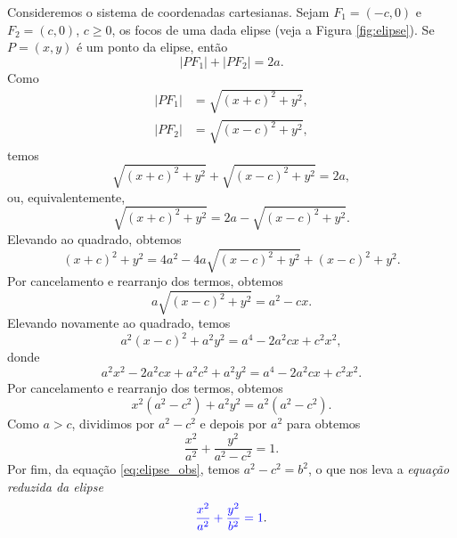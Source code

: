 Consideremos o sistema de coordenadas cartesianas. Sejam $F_1=(-c,0)$ e $F_2=(c,0)$, $c\geq 0$, os focos de uma dada elipse (veja a Figura \ref{fig:elipse}).  Se $P=(x,y)$ é um ponto da elipse, então
\begin{equation}
  |PF_1| + |PF_2| = 2a.
\end{equation}
Como
\begin{align}
  |PF_1| &= \sqrt{(x+c)^2 + y^2}, \\
  |PF_2| &= \sqrt{(x-c)^2 + y^2},
\end{align}
temos
\begin{equation}
  \sqrt{(x+c)^2 + y^2} + \sqrt{(x-c)^2 + y^2} = 2a,
\end{equation}
ou, equivalentemente,
\begin{equation}
  \sqrt{(x+c)^2 + y^2} = 2a - \sqrt{(x-c)^2 + y^2}.
\end{equation}
Elevando ao quadrado, obtemos
\begin{equation}
  (x+c)^2 + y^2 = 4a^2 - 4a\sqrt{(x-c)^2+y^2} + (x-c)^2+y^2.
\end{equation}
Por cancelamento e rearranjo dos termos, obtemos
\begin{equation}
  a\sqrt{(x-c)^2+y^2}=a^2-cx.
\end{equation}
Elevando novamente ao quadrado, temos
\begin{equation}
  a^2(x-c)^2+a^2y^2=a^4-2a^2cx+c^2x^2,
\end{equation}
donde
\begin{equation}
  a^2x^2 -2a^2cx + a^2c^2 + a^2y^2= a^4 -2a^2cx + c^2x^2.
\end{equation}
Por cancelamento e rearranjo dos termos, obtemos
\begin{equation}
  x^2(a^2 - c^2) + a^2y^2 = a^2(a^2 - c^2).
\end{equation}
Como $a>c$, dividimos por $a^2-c^2$  e depois por $a^2$ para obtemos
\begin{equation}
  \frac{x^2}{a^2} + \frac{y^2}{a^2-c^2} = 1.
\end{equation}
Por fim, da equação \eqref{eq:elipse_obs}, temos $a^2-c^2 = b^2$, o que nos leva  a \emph{equação reduzida da elipse}
\begin{equation}
  {\color{blue}\frac{x^2}{a^2} + \frac{y^2}{b^2} = 1}.
\end{equation}

